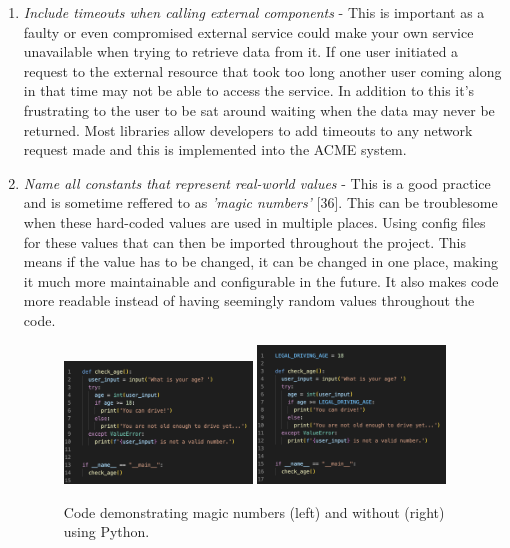 \begin{enumerate}
    \item \textit{Include timeouts when calling external components} - This is important as a faulty or even compromised external service could make
    your own service unavailable when trying to retrieve data from it. If one user initiated a request to the external resource that took too long 
    another user coming along in that time may not be able to access the service. In addition to this it's frustrating to the user to be sat 
    around waiting when the data may never be returned. Most libraries allow developers to add timeouts to any network request made and this is 
    implemented into the ACME system.

    \item \textit{Name all constants that represent real-world values} - This is a good practice and is sometime reffered to as \textit{'magic numbers'} [36].
    This can be troublesome when these hard-coded values are used in multiple places. Using config files for these values that can then be imported 
    throughout the project. This means if the value has to be changed, it can be changed in one place, making it much more maintainable and configurable
    in the future. It also makes code more readable instead of having seemingly random values throughout the code.

    \begin{figure}[H]
      \centering
      \includegraphics[width=5cm]{assets/magicNumbers.png}
      \includegraphics[width=5cm]{assets/noMagicNumbers.png}
      \caption{Code demonstrating magic numbers (left) and without (right) using Python.}
      \label{fig:magicNumbers}
    \end{figure}

  \end{enumerate}


